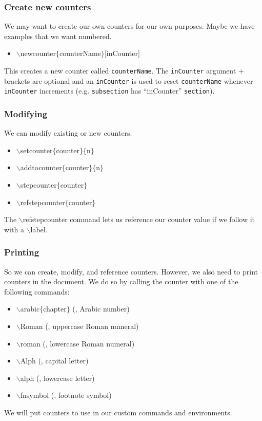 \begin{frame}  \frametitle{Create new counters}
	We may want to create our own counters for our own purposes. Maybe we have examples that we want numbered.
	\begin{itemize}
		\item[] {\color{command}$\backslash$newcounter\color{braces}$\{${\color{black}counterName}$\}$\color{black}[inCounter]}
	\end{itemize}
	This creates a new counter called \texttt{counterName}. The \texttt{inCounter} argument $+$ brackets are optional and an \texttt{inCounter} is used to reset \texttt{counterName} whenever \texttt{inCounter} increments (e.g. \texttt{subsection} has ``inCounter'' \texttt{section}).
\end{frame}

\begin{frame}  \frametitle{Modifying}
	We can modify existing or new counters.
	\begin{itemize}
		\item[] {\color{command}$\backslash$setcounter\color{braces}$\{${\color{black}counter}$\}\{${\color{black}n}$\}$}
		\item[] {\color{command}$\backslash$addtocounter\color{braces}$\{${\color{black}counter}$\}\{${\color{black}n}$\}$}
		\item[] {\color{command}$\backslash$stepcounter\color{braces}$\{${\color{black}counter}$\}$}
		\item[] {\color{command}$\backslash$refstepcounter\color{braces}$\{${\color{black}counter}$\}$}
	\end{itemize}
	The {\color{command}$\backslash$refstepcounter} command lets us reference our counter value if we follow it with a {\color{command}$\backslash$label}.
\end{frame}

\begin{frame}  \frametitle{Printing}
	So we can create, modify, and reference counters. However, we also need to print counters in the document. We do so by calling the counter with one of the following commands:
	\setcounter{temp}{4}
	\begin{itemize}
		\item[] {\color{command}$\backslash$arabic}{\color{braces}$\{${\color{black}chapter}$\}$} (, Arabic number)
		\item[] {\color{command}$\backslash$Roman} (, uppercase Roman numeral)
		\item[] {\color{command}$\backslash$roman} (, lowercase Roman numeral)
		\item[] {\color{command}$\backslash$Alph} (, capital letter)
		\item[] {\color{command}$\backslash$alph} (, lowercase letter)
		\item[] {\color{command}$\backslash$fnsymbol} (, footnote symbol)
	\end{itemize}
	We will put counters to use in our custom commands and environments.
\end{frame}

